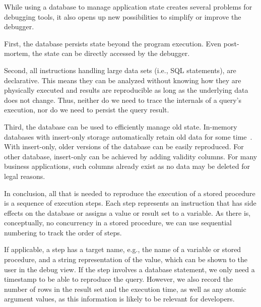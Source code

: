 \documentclass[english]{sig-alternate-05-2015}
\newcommand{\todo}[2][]{\pdfmargincomment[author={#1}]{#2}}
\begin{document}
While using a database to manage application state creates several problems for debugging tools, it also opens up new possibilities to simplify or improve the debugger.

First, the database persists state beyond the program execution.
Even post-mortem, the state can be directly accessed by the debugger.

Second, all instructions handling large data sets (i.e., SQL statements), are declarative.
This means they can be analyzed without knowing how they are physically executed and results are reproducible as long as the underlying data does not change.
Thus, neither do we need to trace the internals of a query's execution, nor do we need to persist the query result.
\todo{MP: This is not clear to me, yet.}

Third, the database can be used to efficiently manage old state.
In-memory databases with insert-only storage automatically retain old data for some time~\cite{Plattner2009Acd}.
With insert-only, older versions of the database can be easily reproduced.
For other database, insert-only can be achieved by adding validity columns.
For many business applications, such columns already exist as no data may be deleted for legal reasons.

In conclusion, all that is needed to reproduce the execution of a stored procedure is a sequence of execution steps.
Each step represents an instruction that has side effects on the database or assigns a value or result set to a variable.
As there is, conceptually, no concurrency in a stored procedure, we can use sequential numbering to track the order of steps.

If applicable, a step has a target name, e.g., the name of a variable or stored procedure, and a string representation of the value, which can be shown to the user in the debug view.
If the step involves a database statement, we only need a timestamp to be able to reproduce the query.
However, we also record the number of rows in the result set and the execution time, as well as any atomic argument values, as this information is likely to be relevant for developers.

\end{document}
